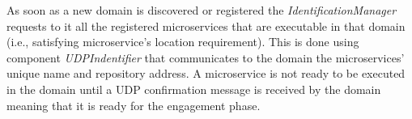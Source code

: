 


As soon as a new domain is discovered or registered the \textit{IdentificationManager} requests to it all the registered microservices that are executable in that domain (i.e., satisfying microservice's location requirement). This is done using component \textit{UDPIndentifier} that communicates  to the domain the microservices' unique name and repository address. A microservice is not ready to be executed in the domain until a UDP confirmation message is received by the domain meaning that it is ready for the engagement phase. 



